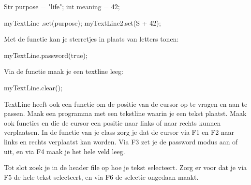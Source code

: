 \begin{code}
Str purpose = "life";
int meaning = 42;

myTextLine .set(purpose);
myTextLine2.set(S +  42);
\end{code}

Met de functie  kan je sterretjes in plaats van letters tonen:

\begin{code}
myTextLine.password(true);
\end{code}

Via de functie  maak je een textline leeg:

\begin{code}
myTextLine.clear();
\end{code}

\begin{exercise}
TextLine heeft ook een functie  om de positie van de cursor op te vragen en aan te passen. Maak een programma met een tekstline waarin je een tekst plaatst. Maak ook functies  en  die de cursor een positie naar links of naar rechts kunnen verplaatsen. In de  functie van je class zorg je dat de cursor via F1 en F2 naar links en rechts verplaatst kan worden. Via F3 zet je de password modus aan of uit, en via F4 maak je het hele veld leeg.

Tot slot zoek je in de header file op hoe je tekst selecteert. Zorg er voor dat je via F5 de hele tekst selecteert, en via F6 de selectie ongedaan maakt.
\end{exercise}










